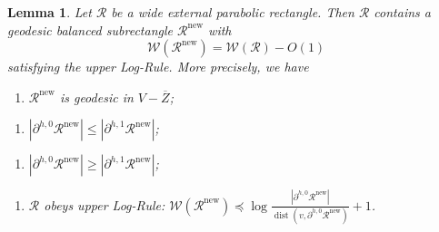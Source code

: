 \documentclass{amsart}
\newcommand{\1}{{\mathbb 1 }}
\newcommand{\Width}{{\mathcal W}}
\newcommand\RR{\mathcal{R}}
\newcommand\new{{\operatorname{new}}}
\newtheorem{lem}[thm]{Lemma}
\theoremstyle{remark}
\numberwithin{equation}{section}
\theoremstyle{definition}
\newcommand{\dist}{\operatorname{dist}}
\begin{document}
\begin{lem}\label{lem:Balanced subrectangle}
    Let $\RR$ be a wide external parabolic rectangle. Then $\RR$ contains a geodesic balanced subrectangle $\RR^\new$ with 
    $$
    \Width(\RR^\new) = \Width(\RR) - O(1)
    $$ 
    satisfying the upper Log-Rule. More precisely, we have
    \begin{enumerate}[label=(\arabic*)]
    \item\label{cl:1:bpar_rect} $\RR^\new$ is geodesic in $V - \overline{Z}$;
 \end{enumerate} 
 \begin{enumerate}[label=(\arabic*a),start=2]
    \item\label{cl:2:bpar_rect} $|\partial^{h,0} \RR^\new|\le |\partial^{h,1} \RR^\new|$;
  \end{enumerate} 
 \begin{enumerate}[label=(\arabic*b),start=2]   
    \item\label{cl:4:bpar_rect} $|\partial^{h,0} \RR^\new|\ge |\partial^{h,1} \RR^\new|$;
\end{enumerate} 
 \begin{enumerate}[label=(\arabic*),start=3]
    \item\label{cl:3:bpar_rect} $\RR$ obeys upper Log-Rule: $\Width(\RR^\new) \preceq \log \frac{|\partial^{h,0} \RR^\new|}{\dist(v, \partial^{h,0} \RR^\new)} + 1$.
\end{enumerate}
\end{lem}
\end{document}
